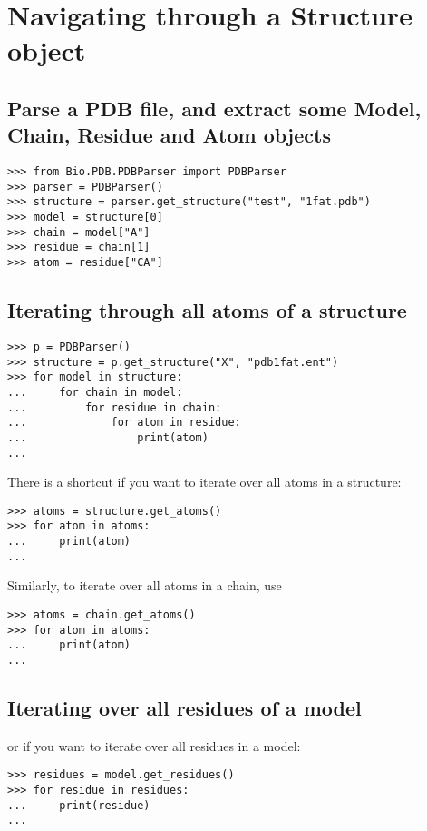 \section{Navigating through a Structure object}

\subsection*{Parse a PDB file, and extract some Model, Chain, Residue and Atom objects}

\begin{verbatim}
>>> from Bio.PDB.PDBParser import PDBParser
>>> parser = PDBParser()
>>> structure = parser.get_structure("test", "1fat.pdb")
>>> model = structure[0]
>>> chain = model["A"]
>>> residue = chain[1]
>>> atom = residue["CA"]
\end{verbatim}

\subsection*{Iterating through all atoms of a structure}

\begin{verbatim}
>>> p = PDBParser()
>>> structure = p.get_structure("X", "pdb1fat.ent")
>>> for model in structure:
...     for chain in model:
...         for residue in chain:
...             for atom in residue:
...                 print(atom)
...
\end{verbatim}

There is a shortcut if you want to iterate over all atoms in a structure:
\begin{verbatim}
>>> atoms = structure.get_atoms()
>>> for atom in atoms:
...     print(atom)
...
\end{verbatim}

Similarly, to iterate over all atoms in a chain, use
\begin{verbatim}
>>> atoms = chain.get_atoms()
>>> for atom in atoms:
...     print(atom)
...
\end{verbatim}

\subsection*{Iterating over all residues of a model}

or if you want to iterate over all residues in a model:
\begin{verbatim}
>>> residues = model.get_residues()
>>> for residue in residues:
...     print(residue)
...
\end{verbatim}

